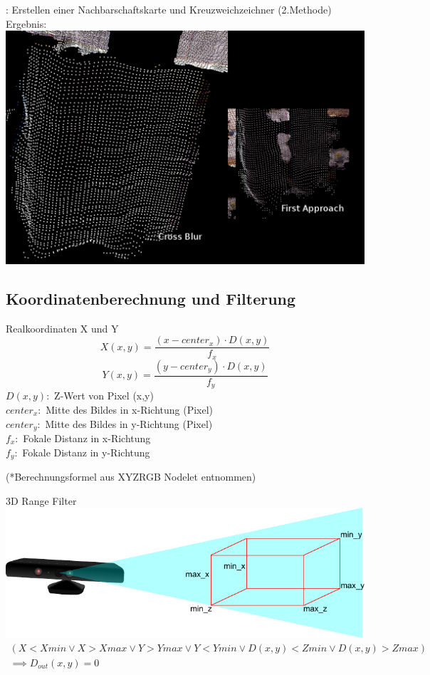 \documentclass{VLKlauck}
\begin{document}
	   
	\begin{frame}{\insertsubsection: Erstellen einer Nachbarschaftskarte und Kreuzweichzeichner (2.Methode)}
	   Ergebnis:
	   \includegraphics[width=\textwidth]{crossBlurResult.png}
	\end{frame}
	   
	\subsection{Koordinatenberechnung und Filterung}
	\begin{frame}{Realkoordinaten X und Y}
	$$X(x,y)=\frac{(x-center_x) \cdot D(x,y)}{f_x}$$
	$$Y(x,y)=\frac{(y-center_y) \cdot D(x,y)}{f_y}$$
	$D(x,y):$ Z-Wert von Pixel (x,y)\\
	$center_x :$ Mitte des Bildes in x-Richtung (Pixel)\\
	$center_y :$ Mitte des Bildes in y-Richtung (Pixel)\\	
	$f_x:$ Fokale Distanz in x-Richtung\\
	$f_y:$ Fokale Distanz in y-Richtung
	
	(*Berechnungsformel aus XYZRGB Nodelet entnommen)
	
	\end{frame}
	   
	\begin{frame}{3D Range Filter}
	 \includegraphics[width=\textwidth]{XYZFilter.pdf}
	 {\tiny
	 \begin{equation}
 	 \begin{split}
 	   	(X < Xmin \vee X > Xmax \vee Y > Ymax \vee Y < Ymin \vee D(x,y) < Zmin \vee D(x,y) > Zmax)\\
 	   	\implies D_{out}(x,y) = 0    	   
 	 \end{split}
 	 \nonumber
	\end{equation}
	} 	 
	\end{frame}
	
\end{document}
